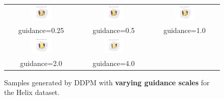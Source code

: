 \documentclass[11pt]{article}
\begin{document}
\begin{figure}[H]
    \centering
    \begin{tabular}{ccc}
        \includegraphics[width=0.3\textwidth]{exps/ddpm_3_150_0.0001_0.02_helix/samples_cfg_150_0.25.png} &
        \includegraphics[width=0.3\textwidth]{exps/ddpm_3_150_0.0001_0.02_helix/samples_cfg_150_0.5.png} &
        \includegraphics[width=0.3\textwidth]{exps/ddpm_3_150_0.0001_0.02_helix/samples_cfg_150_1.0.png} \\
        guidance=0.25 & guidance=0.5 & guidance=1.0 \\ [0.5em]
        
        \includegraphics[width=0.3\textwidth]{exps/ddpm_3_150_0.0001_0.02_helix/samples_cfg_150_2.0.png} &
        \includegraphics[width=0.3\textwidth]{exps/ddpm_3_150_0.0001_0.02_helix/samples_cfg_150_4.0.png} & \\
        guidance=2.0 & guidance=4.0 & \\
    \end{tabular}
    \caption{Samples generated by DDPM with \textbf{varying guidance scales} for the Helix dataset.}
    \label{fig:guidance_helix}
\end{figure}



\end{document}
